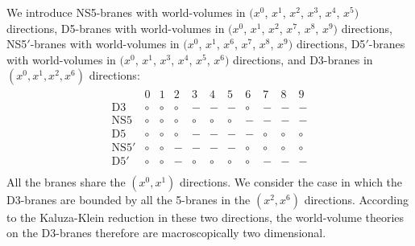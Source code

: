 \documentclass{article}
\numberwithin{equation}{section}
\begin{document}
We introduce NS5-branes with world-volumes in $(x^{0}$, $x^{1}$, $x^{2}$, $x^{3}$, $x^{4}$, $x^{5})$ directions, 
D5-branes with world-volumes in $(x^{0}$, $x^{1}$, $x^{2}$, $x^{7}$, $x^{8}$, $x^{9})$ directions, 
NS5$'$-branes with world-volumes in $(x^{0}$, $x^{1}$, $x^{6}$, $x^{7}$, $x^{8}$, $x^{9})$ directions, 
D5$'$-branes with world-volumes in $(x^{0}$, $x^{1}$, $x^{3}$, $x^{4}$, $x^{5}$, $x^{6})$ directions, 
and D3-branes in $(x^{0}, x^{1}, x^{2}, x^{6})$ directions: 
\begin{align}
\label{04_brane1}
\begin{array}{ccccccccccc}
&0&1&2&3&4&5&6&7&8&9\\
\textrm{D3}
&\circ&\circ&\circ&-&-&-&\circ&-&-&- \\
\textrm{NS5}
&\circ&\circ&\circ&\circ&\circ&\circ&-&-&-&- \\
\textrm{D5}
&\circ&\circ&\circ&-&-&-&-&\circ&\circ&\circ \\
\textrm{NS5$'$}
&\circ&\circ&-&-&-&-&\circ&\circ&\circ&\circ \\
\textrm{D5$'$}
&\circ&\circ&-&\circ&\circ&\circ&\circ&-&-&- \\
\end{array}
\end{align}
All the branes share the $(x^0, x^1)$ directions. 
We consider the case in which 
the D3-branes are bounded by all the 5-branes in the $(x^{2}, x^{6})$ directions. 
According to the Kaluza-Klein reduction in these two directions, 
the world-volume theories on the D3-branes therefore are macroscopically two dimensional. 
\end{document}
